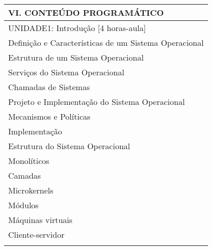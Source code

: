 \documentclass[12pt]{article}
\begin{document}
\begin{longtable}{|L{1.025\textwidth}|} \hline
%
{\bf VI. CONTEÚDO PROGRAMÁTICO } \\ \hline
UNIDADE1: Introdução [4 horas-aula]\\
Definição e Características de um Sistema Operacional\\
Estrutura de um Sistema Operacional\\
Serviços do Sistema Operacional\\
Chamadas de Sistemas\\
Projeto e Implementação do Sistema Operacional\\
Mecanismos e Políticas\\
Implementação\\
Estrutura do Sistema Operacional\\
Monolíticos\\
Camadas\\
Microkernels\\
Módulos\\
Máquinas virtuais\\
Cliente-servidor\\
\\


\end{longtable}
\end{document}
